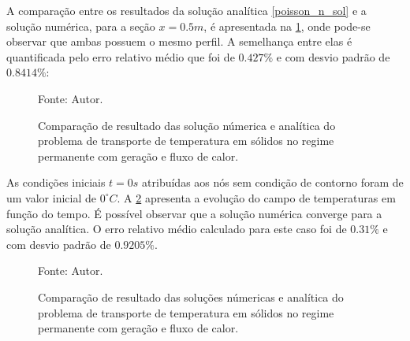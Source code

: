 A comparação entre os resultados da solução analítica \eqref{poisson_n_sol} e a solução numérica, para a seção $x=0.5m$, é apresentada na \ref{poisson_n_perm_comp}, onde pode-se observar que ambas possuem o mesmo perfil.
A semelhança entre elas é quantificada pelo erro relativo médio que foi de $0.427\%$ e com desvio padrão de $0.8414\%$:
\begin{figure}[H]
    \centering
     {\raggedleft \scriptsize Fonte: Autor.}
    \caption{Comparação de resultado das solução númerica e analítica do problema de transporte de temperatura em sólidos no regime permanente com geração e fluxo de calor.}
    \label{poisson_n_perm_comp}
\end{figure}

As condições iniciais $t=0s$ atribuídas aos nós sem condição de contorno foram de um valor inicial de $0^{\circ}C$.
A \ref{poisson_n_trans_comp} apresenta a evolução do campo de temperaturas em função do tempo.
É possível observar que a solução numérica converge para a solução analítica.
O erro relativo médio calculado para este caso foi de $0.31\%$ e com desvio padrão de $0.9205\%$.
\begin{figure}[H]
    \centering
     {\raggedleft \scriptsize Fonte: Autor.}
    \caption{Comparação de resultado das soluções númericas e analítica do problema de transporte de temperatura em sólidos no regime permanente com geração e fluxo de calor.}
    \label{poisson_n_trans_comp}
\end{figure}

